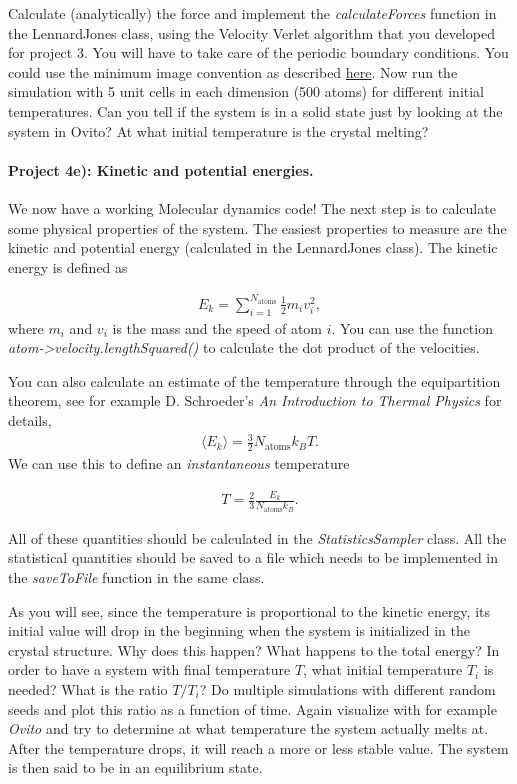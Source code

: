 \documentclass[%
oneside,                 %
final,                   %
10pt]{article}
\begin{document}
Calculate (analytically) the force and implement the \emph{calculateForces} function in the LennardJones class, using the Velocity Verlet algorithm that you developed for project 3. You will have to take care of the periodic boundary conditions. You could use the minimum image convention as described \href{{http://en.wikipedia.org/wiki/Periodic_boundary_conditions}}{here}. Now run the simulation with 5 unit cells in each dimension (500 atoms) for different initial temperatures. Can you tell if the system is in a solid state just by looking at the system in Ovito? At what initial temperature is the crystal melting?

\paragraph{Project 4e): Kinetic and potential energies.}
We now have a working Molecular dynamics code! The next step is to calculate some physical properties of the system. The easiest properties to measure are the kinetic and potential energy (calculated in the LennardJones class). The kinetic energy is defined as

\begin{align}
	E_k = \sum_{i=1}^{N_\text{atoms}} \frac{1}{2} m_i v_i^2,
\end{align}
where $m_i$ and $v_i$ is the mass and the speed of atom $i$. You can use the function \emph{atom->velocity.lengthSquared()} to calculate the dot product of the velocities. 

You can also calculate an estimate of the temperature through the equipartition theorem, see for example D. Schroeder's \emph{An Introduction to Thermal Physics} for details,
\begin{align}
	\langle E_k \rangle = \frac{3}{2}N_\text{atoms} k_B T.
\end{align}
We can use this to define an \emph{instantaneous} temperature

\begin{align}
	T = \frac{2}{3}\frac{E_k}{N_\text{atoms} k_B}.
\end{align}

All of these quantities should be calculated in the \emph{StatisticsSampler} class. All the statistical quantities should be saved to a file which needs to be implemented in the \emph{saveToFile} function in the same class. 

As you will see, since the temperature is proportional to the kinetic energy, its initial value will drop in the beginning when the system is initialized in the crystal structure. Why does this happen? What happens to the total energy? In order to have a system with final temperature $T$, what initial temperature $T_i$ is needed? What is the ratio $T/T_i$? Do multiple simulations with different random seeds and plot this ratio as a function of time. Again visualize with for example \emph{Ovito} and try to determine at what temperature the system actually melts at. After the temperature drops, it will reach a more or less stable value. The system is then said to be in an equilibrium state.
\end{document}
